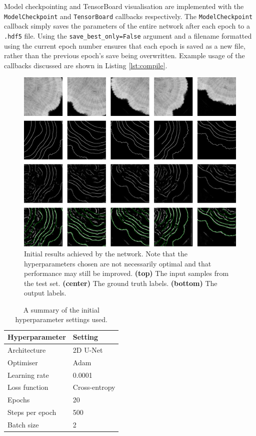 Model checkpointing and TensorBoard visualisation are implemented with the \texttt{ModelCheckpoint} and \texttt{TensorBoard} callbacks respectively. The \texttt{ModelCheckpoint} callback simply saves the parameters of the entire network after each epoch to a \texttt{.hdf5} file. Using the \texttt{save\_best\_only=False} argument and a filename formatted using the current epoch number ensures that each epoch is saved as a new file, rather than the previous epoch's save being overwritten. Example usage of the callbacks discussed are shown in Listing \ref{lst:compile}.

\begin{figure}[t]
    \centering
    \includegraphics[width=1\textwidth]{images/initial-outputs.png}
    \caption{Initial results achieved by the network. Note that the hyperparameters chosen are not necessarily optimal and that performance may still be improved. \textbf{(top)} The input samples from the test set. \textbf{(center)} The ground truth labels. \textbf{(bottom)} The output labels.}
    \label{fig:outputs}
\end{figure}

\begin{table}[t]
    \centering
    \caption{A summary of the initial hyperparameter settings used.}
    \begin{tabular}{@{}ll@{}}
    \toprule
    Hyperparameter   & Setting      \\ \midrule
    Architecture     & 2D U-Net   \\
    Optimiser & Adam \\
    Learning rate & 0.0001 \\
    Loss function & Cross-entropy \\
    Epochs & 20 \\
    Steps per epoch & 500 \\
    Batch size & 2 \\ \bottomrule
    \end{tabular}
    \label{tab:initialhyperparams}
\end{table}

